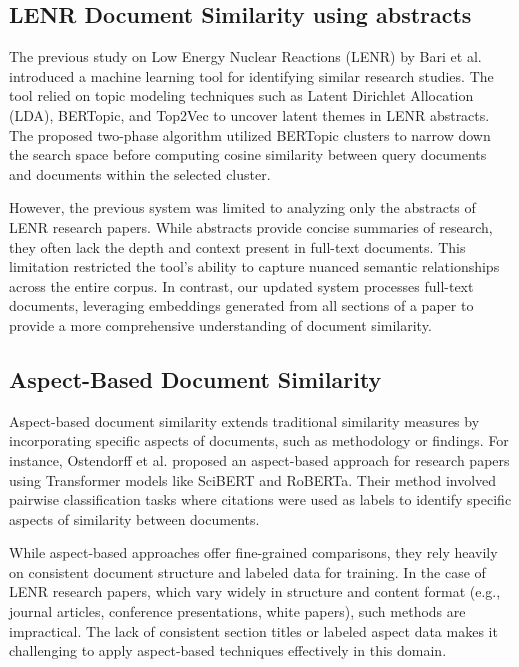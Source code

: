 \documentclass[12pt]{article}
\begin{document}
    \subsection{LENR Document Similarity using abstracts}
    
    The previous study on Low Energy Nuclear Reactions (LENR) by Bari et al. \cite{FrontierAI2024} introduced a machine learning tool for identifying similar research studies. The tool relied on topic modeling techniques such as Latent Dirichlet Allocation (LDA), BERTopic, and Top2Vec to uncover latent themes in LENR abstracts. The proposed two-phase algorithm utilized BERTopic clusters to narrow down the search space before computing cosine similarity between query documents and documents within the selected cluster.
    
    However, the previous system was limited to analyzing only the abstracts of LENR research papers. While abstracts provide concise summaries of research, they often lack the depth and context present in full-text documents. This limitation restricted the tool's ability to capture nuanced semantic relationships across the entire corpus. In contrast, our updated system processes full-text documents, leveraging embeddings generated from all sections of a paper to provide a more comprehensive understanding of document similarity.
    
    \subsection{Aspect-Based Document Similarity}
    
    Aspect-based document similarity extends traditional similarity measures by incorporating specific aspects of documents, such as methodology or findings. For instance, Ostendorff et al. \cite{Ostendorff2020} proposed an aspect-based approach for research papers using Transformer models like SciBERT and RoBERTa. Their method involved pairwise classification tasks where citations were used as labels to identify specific aspects of similarity between documents.
    
    While aspect-based approaches offer fine-grained comparisons, they rely heavily on consistent document structure and labeled data for training. In the case of LENR research papers, which vary widely in structure and content format (e.g., journal articles, conference presentations, white papers), such methods are impractical. The lack of consistent section titles or labeled aspect data makes it challenging to apply aspect-based techniques effectively in this domain.
    
\end{document}
